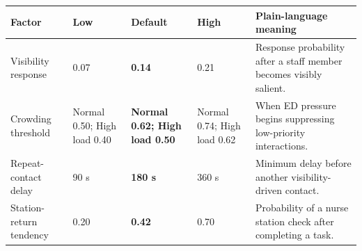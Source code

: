 \begin{tabular}{lllll}
\toprule
\textbf{Factor} & \textbf{Low} & \textbf{Default} & \textbf{High} & \textbf{Plain-language meaning} \\
\midrule
Visibility response & 0.07 & \textbf{0.14} & 0.21 & Response probability after a staff member becomes visibly salient. \\
Crowding threshold & Normal 0.50; High load 0.40 & \textbf{Normal 0.62; High load 0.50} & Normal 0.74; High load 0.62 & When ED pressure begins suppressing low-priority interactions. \\
Repeat-contact delay & 90 s & \textbf{180 s} & 360 s & Minimum delay before another visibility-driven contact. \\
Station-return tendency & 0.20 & \textbf{0.42} & 0.70 & Probability of a nurse station check after completing a task. \\
\bottomrule
\end{tabular}

